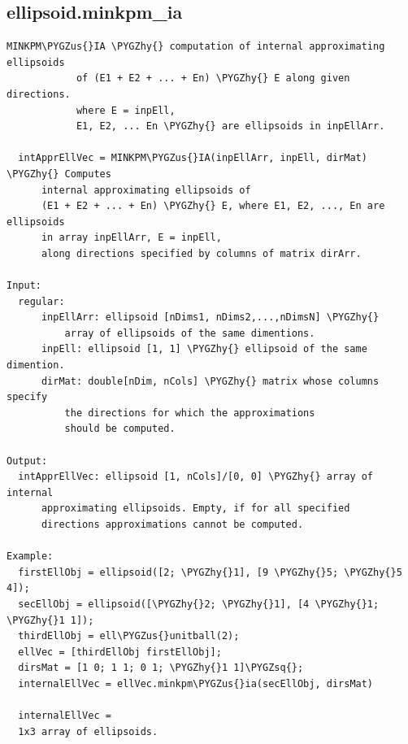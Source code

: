 \documentclass[letterpaper,10pt,english]{sphinxmanual}
\def\PYGZus{\char`\_}
\def\PYGZhy{\char`\-}
\def\PYGZsq{\char`\'}
\begin{document}
\subsection{ellipsoid.minkpm\_ia}
\label{chap_functions:ellipsoid-minkpm-ia}
\begin{Verbatim}[commandchars=\\\{\}]
MINKPM\PYGZus{}IA \PYGZhy{} computation of internal approximating ellipsoids
            of (E1 + E2 + ... + En) \PYGZhy{} E along given directions.
            where E = inpEll,
            E1, E2, ... En \PYGZhy{} are ellipsoids in inpEllArr.

  intApprEllVec = MINKPM\PYGZus{}IA(inpEllArr, inpEll, dirMat) \PYGZhy{} Computes
      internal approximating ellipsoids of
      (E1 + E2 + ... + En) \PYGZhy{} E, where E1, E2, ..., En are ellipsoids
      in array inpEllArr, E = inpEll,
      along directions specified by columns of matrix dirArr.

Input:
  regular:
      inpEllArr: ellipsoid [nDims1, nDims2,...,nDimsN] \PYGZhy{}
          array of ellipsoids of the same dimentions.
      inpEll: ellipsoid [1, 1] \PYGZhy{} ellipsoid of the same dimention.
      dirMat: double[nDim, nCols] \PYGZhy{} matrix whose columns specify
          the directions for which the approximations
          should be computed.

Output:
  intApprEllVec: ellipsoid [1, nCols]/[0, 0] \PYGZhy{} array of internal
      approximating ellipsoids. Empty, if for all specified
      directions approximations cannot be computed.

Example:
  firstEllObj = ellipsoid([2; \PYGZhy{}1], [9 \PYGZhy{}5; \PYGZhy{}5 4]);
  secEllObj = ellipsoid([\PYGZhy{}2; \PYGZhy{}1], [4 \PYGZhy{}1; \PYGZhy{}1 1]);
  thirdEllObj = ell\PYGZus{}unitball(2);
  ellVec = [thirdEllObj firstEllObj];
  dirsMat = [1 0; 1 1; 0 1; \PYGZhy{}1 1]\PYGZsq{};
  internalEllVec = ellVec.minkpm\PYGZus{}ia(secEllObj, dirsMat)

  internalEllVec =
  1x3 array of ellipsoids.
\end{Verbatim}
\end{document}
